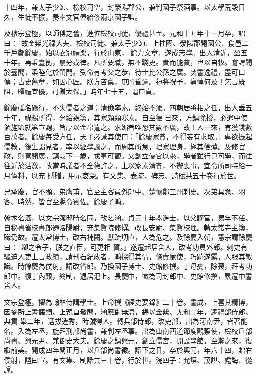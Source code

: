 \begin{pinyinscope}
 十四年，兼太子少師、檢校司空，封滎陽郡公，兼判國子祭酒事。以太學荒毀日久，生徒不振，奏率文官俸給修兩京國子監。



 及穆宗登極，以師傅之舊，進位檢校司徒，優禮甚至。元和十五年十一月卒，詔曰：「故金紫光祿大夫、檢校司徒、兼太子少師、上柱國、滎陽郡開國公、食邑二千戶鄭餘慶，始以衣冠禮樂，行於山東，
 餘力文章，遂成志學。出入清近，盈五十年。再秉臺衡，屢分戎律。凡所要職，無不踐更。貴而能貧，卑以自牧。謇諤聞於臺閣，柔睦化於閨門。受命有考父之恭，待士比公孫之廣。焚書逸禮，盡可口傳；古史舊章，如因心匠。朕方咨稟，庶罔昏逾。神將祝予，痛悼何及！乞言既阻，賵禮宜優，可贈太保。」時年七十五，謚曰貞。



 餘慶砥名礪行，不失儒者之道；清儉率素，終始不渝。四朝居將相之任，出入垂五十年，祿賜所得，分給親黨，其家頗類寒素。自至德
 已來，方鎮除授，必遣中使領旌節就第宣賜，皆厚以金帛遣之。求媚者唯恐其數不廣，故王人一來，有獲錢數百萬者。餘慶每受方任，天子必誡其使曰：「餘慶家貧，不得妄有求取。」專欲振起儒教，後生謁見者，率以經學諷之。而周其所急，理家理身，極其儉薄。及修官政，則喜開廣。鎮岐下一歲，戎事可觀。又創立儒宮以來，學者雖行己可學，而往往近於沽激，故當時議者不全德許之。上以家素清貧，不辦喪事，宜令所司特給一月俸料，以充
 賻贈，用示哀榮。有文集、表疏、碑志、詩賦共五十卷行於世。



 兄承慶，官不顯。弟膺甫，官至主客員外郎中、楚懷鄭三州刺史。次弟具瞻、羽客、時然，皆官至縣令賓佐。餘慶子瀚。



 翰本名涵，以文宗籓邸時名同，改名瀚。貞元十年舉進士。以父謫官，累年不任。自秘書省校書郎遷洛陽尉，充集賢院修撰。改長安尉、集賢校理。轉太常寺主簿，職仍故。遷太常博士，改右補闕。獻疏切直，人為危之。及餘慶入朝，憲宗謂餘慶曰：「卿之令子，朕之直臣，可更相
 賀。」遂遷起居舍人，改考功員外郎。刺史有驅迫人吏上言政績，請刊石紀政者，瀚探得其情，條責廉使，巧跡遂露，人服其敏識。時餘慶為僕射，請改省郎。乃換國子博士、史館修撰。丁母憂，除喪，拜考功郎中。復丁內艱，終制，退居汜上。長慶中，徵為司封郎中、史館修撰，累遷中書舍人。



 文宗登極，擢為翰林侍講學士。上命撰《經史要錄》二十卷。書成，上喜其精博，因摘所上書語類。上親自發問，瀚應對無滯，錫以金紫。太和二年，遷禮部侍郎。典貢
 舉二年，選拔造秀，時號得人。轉兵部侍郎，改吏部，出為河南尹，皆著能名。入為左丞，旋拜刑部尚書，兼判左丞事。出為山南西道節度觀察使，檢校戶部尚書、興元尹、兼御史大夫。餘慶之鎮興元，創立儒宮，開設學館，至瀚之來，復繼前美。開成四年閏正月，以戶部尚書徵。詔下之日，卒於興元，年六十四，贈右僕射，謚曰宣。有文集、制誥共三十卷，行於世。浣四子：允謨、茂諶、處誨、從讜。




\end{pinyinscope}
